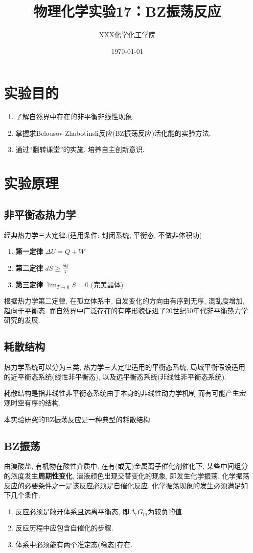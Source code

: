 \documentclass[a4paper]{article}
\title{物理化学实验17：BZ振荡反应}
\author{XXX\quad 123456789\quad 化学化工学院}
\date{\today}
\begin{document}
\maketitle

\section{实验目的}
\begin{enumerate}
\item 了解自然界中存在的非平衡非线性现象.
\item 掌握求Belousov-Zhabotinsli反应(BZ振荡反应)活化能的实验方法.
\item 通过``翻转课堂''的实施, 培养自主创新意识.
\end{enumerate}
\section{实验原理}
\subsection{非平衡态热力学}
经典热力学三大定律:(适用条件: 封闭系统, 平衡态, 不做非体积功)
\begin{enumerate}
	\item \textbf{第一定律} $\Delta U=Q+W$
	\item \textbf{第二定律} $dS\ge \frac{\delta Q}{T}$
	\item \textbf{第三定律} $\lim_{T \to 0}S=0$ (完美晶体)
\end{enumerate}	
\par
根据热力学第二定律, 在孤立体系中, 
自发变化的方向由有序到无序, 混乱度增加,趋向于平衡态. 
而自然界中广泛存在的有序形貌促进了20世纪50年代非平衡热力学研究的发展.

\subsection{耗散结构}
热力学系统可以分为三类, 热力学三大定律适用的平衡态系统, 
局域平衡假设适用的近平衡态系统(线性非平衡态), 
以及远平衡态系统(非线性非平衡态系统).\par
耗散结构是指非线性非平衡态系统由于本身的非线性动力学机制
而有可能产生宏观时空有序的结构.\par
本实验研究的BZ振荡反应是一种典型的耗散结构.
\subsection{BZ振荡}
由溴酸盐, 有机物在酸性介质中, 在有(或无)金属离子催化剂催化下, 
某些中间组分的浓度发生\textbf{周期性变化}, 溶液颜色出现交替变化的现象, 即发生化学振荡.
化学振荡反应的必要条件之一是该反应必须是自催化反应. 化学振荡现象的发生必须满足如下几个条件:
\begin{enumerate}
    \item 反应必须是敞开体系且远离平衡态, 即$\Delta_{r} G_{m}$为较负的值.
    \item 反应历程中应包含自催化的步骤.
    \item 体系中必须能有两个准定态(稳态)存在.
\end{enumerate}
\end{document}
